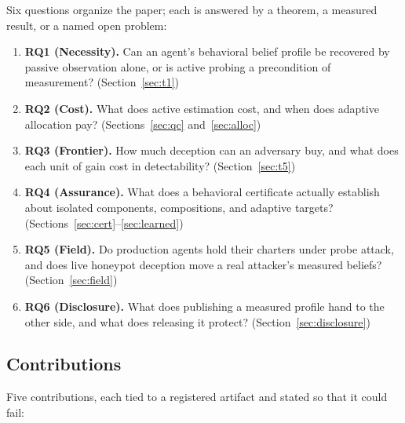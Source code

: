 Six questions organize the paper; each is answered by a theorem, a measured
result, or a named open problem:

\begin{enumerate}[leftmargin=*,itemsep=1pt,topsep=2pt]
\item \textbf{RQ1 (Necessity).} Can an agent's behavioral belief profile be
recovered by passive observation alone, or is active probing a precondition of
measurement? (Section~\ref{sec:t1})
\item \textbf{RQ2 (Cost).} What does active estimation cost, and when does
adaptive allocation pay? (Sections~\ref{sec:qc} and~\ref{sec:alloc})
\item \textbf{RQ3 (Frontier).} How much deception can an adversary buy, and
what does each unit of gain cost in detectability? (Section~\ref{sec:t5})
\item \textbf{RQ4 (Assurance).} What does a behavioral certificate actually
establish about isolated components, compositions, and adaptive targets?
(Sections~\ref{sec:cert}--\ref{sec:learned})
\item \textbf{RQ5 (Field).} Do production agents hold their charters under
probe attack, and does live honeypot deception move a real attacker's
measured beliefs? (Section~\ref{sec:field})
\item \textbf{RQ6 (Disclosure).} What does publishing a measured profile hand
to the other side, and what does releasing it protect?
(Section~\ref{sec:disclosure})
\end{enumerate}

\subsection{Contributions}

Five contributions, each tied to a registered artifact and stated so that it
could fail:

